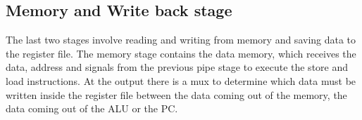 \subsection{Memory and Write back stage}
The last two stages involve reading and writing from memory and saving data to the register file.
The memory stage contains the data memory, which receives the data, address and signals from the previous pipe stage to execute the store and load instructions. At the output there is a mux to determine which data must be written inside the register file between the data coming out of the memory, the data coming out of the ALU or the PC.
